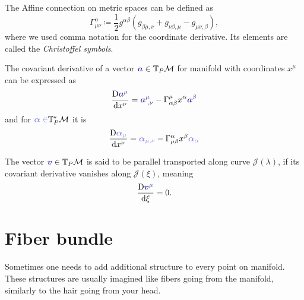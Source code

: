 \begin{definition}
The Affine connection on metric spaces can be defined as
    \begin{equation}
        \Gamma^{\alpha}_{\mu\nu} \coloneqq \frac{1}{2}g^{\alpha \beta}\left(g_{\beta\mu,\nu}+g_{\nu\beta,\mu}-g_{\mu\nu,\beta}\right),
    \end{equation}
    where we used comma notation for the coordinate derivative. Its elements are called the \emph{Christoffel symbols}.
\end{definition}
    The covariant derivative of a vector $\bluee{\bm a}\in \T_P\M$ for manifold with coordinates $x^\mu$ can be expressed as
    \begin{equation}
        \Der{\bluee{\bm a^\mu}}{x^\nu}=\bluee{\bm a_{\;,\nu}^\mu}-\Gamma^\mu_{\alpha\beta} x^\alpha \bluee{\bm a^\beta}
    \end{equation}
    and for $\blueee{\bm\alpha\in} \T_P^*\M$ it is
\begin{equation}
    \Der{\blueee{\bm \alpha_\mu}}{x^\nu}=\blueee{\bm \alpha_{\mu,\nu}}-\Gamma^\alpha_{\mu\beta}x^\beta \blueee{\bm \alpha_\alpha}
\end{equation}

The vector $\bluee{\bm v}\in \T_P\M$ is said to be parallel transported along curve $\mathcal J(\lambda)$, if its covariant derivative vanishes along $\mathcal J(\xi)$, meaning
\begin{equation}
    \Der{\bluee{\bm v^\mu}}{\xi}=0.
\end{equation}

\section{Fiber bundle}
\label{sec:bundleDef}
Sometimes one needs to add additional structure to every point on manifold. These structures are usually imagined like fibers going from the manifold, similarly to the hair going from your head.


